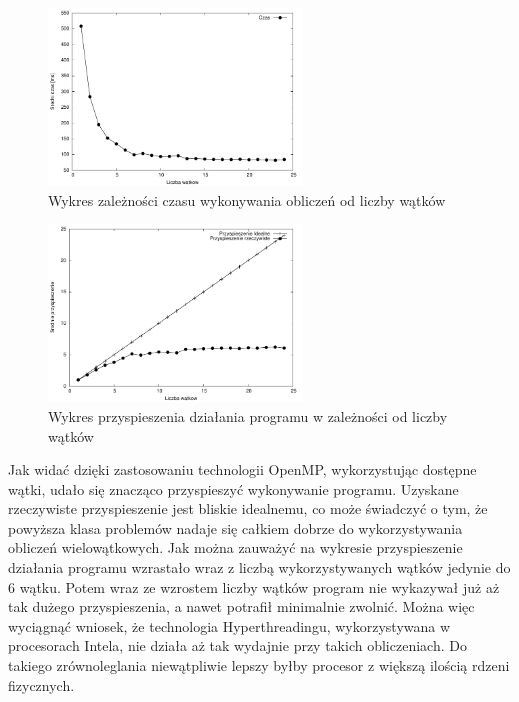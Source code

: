 \documentclass[a4paper,12pt]{article}
\begin{document}
\begin{figure}[!ht]
	\centering
  \includegraphics[width=0.6\textwidth]{wykresCzas-eps-converted-to.pdf}
  \caption{Wykres zależności czasu wykonywania obliczeń od liczby wątków}
\end{figure}

\begin{figure}[!ht]
	\centering
  \includegraphics[width=0.6\textwidth]{wykresPrzyspieszenie-eps-converted-to.pdf}
  \caption{Wykres przyspieszenia działania programu w zależności od liczby wątków}
\end{figure}


Jak widać dzięki zastosowaniu technologii OpenMP, wykorzystując dostępne wątki, udało się znacząco przyspieszyć wykonywanie programu. Uzyskane rzeczywiste przyspieszenie jest bliskie idealnemu, co może świadczyć o tym, że powyższa klasa problemów nadaje się całkiem dobrze do wykorzystywania obliczeń wielowątkowych.
Jak można zauważyć na wykresie przyspieszenie działania programu wzrastało wraz z liczbą wykorzystywanych wątków jedynie do 6 wątku. Potem wraz ze wzrostem liczby wątków program nie wykazywał już aż tak dużego przyspieszenia, a nawet potrafił minimalnie zwolnić. Można więc wyciągnąć wniosek, że technologia Hyperthreadingu, wykorzystywana w procesorach Intela, nie działa aż tak wydajnie przy takich obliczeniach. Do takiego zrównoleglania niewątpliwie lepszy byłby procesor z większą ilością rdzeni fizycznych.
\end{document}
